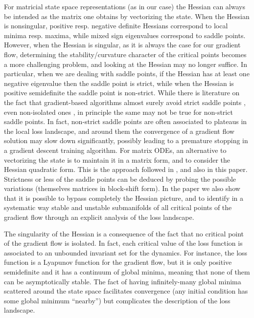 \documentclass{article}
\newcommand{\1}{\mathds{1}}
\begin{document}
For matricial state space representations (as in our case) the Hessian can always be intended as the matrix one obtains by vectorizing the state. 
When the Hessian is nonsingular, positive resp. negative definite Hessians correspond to local minima resp. maxima, while mixed sign eigenvalues correspond to saddle points.
However, when the Hessian is singular, as it is always the case for our gradient flow, determining the stability/curvature character of the critical points becomes a more challenging problem, and looking at the Hessian may no longer suffice. 
In particular, when we are dealing with saddle points, if the Hessian has at least one negative eigenvalue then the saddle point is strict, while when the Hessian is positive semidefinite the saddle point is non-strict. 
While there is literature on the fact that gradient-based algorithms almost surely avoid strict saddle points \cite{lee2019first,bah2022learning}, even non-isolated ones \cite{panageas2016gradient}, in principle the same may not be true for non-strict saddle points.
In fact, non-strict saddle points are often associated to plateaus in the local loss landscape, and around them the convergence of a gradient flow solution may slow down significantly, possibly leading to a premature stopping in a gradient descent training algorithm.
For matrix ODEs, an alternative to vectorizing the state is to maintain it in a matrix form, and to consider the Hessian quadratic form. This is the approach followed in \cite{chitour2018geometric,achour2021loss}, and also in this paper. Strictness or less of the saddle points can be deduced by probing the possible variations (themselves matrices in block-shift form). 
In the paper we also show that it is possible to bypass completely the Hessian picture, and to identify in a systematic way stable and unstable submanifolds of all critical points of the gradient flow through an explicit analysis of the loss landscape. 


The singularity of the Hessian is a consequence of the fact that  no critical point of the gradient flow is isolated. In fact, each critical value of the loss function is associated to an unbounded invariant set for the dynamics. 
For instance, the loss function is a Lyapunov function for the gradient flow, but it is only positive semidefinite and it has a continuum of global minima, meaning that none of them can be asymptotically stable.
The fact of having infinitely-many global minima scattered around the state space facilitates convergence (any initial condition has some global minimum ``nearby'') but complicates the description of the loss landscape. 
\end{document}
